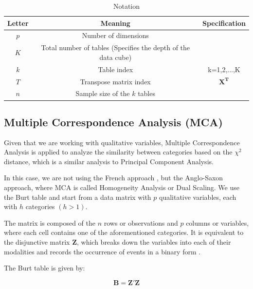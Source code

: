\documentclass[mathematics,article,submit,moreauthors,pdftex]{mdpi}
\begin{document}
\begin{table}[!ht]
\begin{center}
 \begin{tabular}{||c ||c | c ||} 
 \hline
 Letter & Meaning & Specification\\
 \hline\hline
 $p$ & Number of dimensions &\\
\hline
 $K$ &  Total number of tables (Specifies the depth of the data cube) & \\
 \hline
 $k$ & Table index &  k=1,2,...,K\\
  \hline
 $T$ & Transpose matrix index &  $\mathbf{X^{T}}$\\
\hline
 $n$ & Sample size of the $k$ tables &\\
\hline
\end{tabular}\caption{Notation}
\label{tab:notacion2}
\end{center}
\end{table}

\hypertarget{multiple-correspondence-analysis-mca}{%
\subsection{Multiple Correspondence Analysis
(MCA)}\label{multiple-correspondence-analysis-mca}}

Given that we are working with qualitative variables, Multiple
Correspondence Analysis \citep{Benzecri} is applied to analyze the
similarity between categories \citep{perez2004} based on the \(\chi^2\)
distance, which is a similar analysis to Principal Component Analysis.

In this case, we are not using the French approach
\citep{michailidis1998}, but the Anglo-Saxon approach, where MCA is
called Homogeneity Analysis or Dual Scaling. We use the Burt table
\citep{Benzecri} and start from a data matrix with \(p\) qualitative
variables, each with \(h\) categories \((h>1)\).

The matrix is composed of the \(n\) rows or observations and \(p\)
columns or variables, where each cell contains one of the aforementioned
categories. It is equivalent to the disjunctive matrix \textbf{Z}, which
breaks down the variables into each of their modalities and records the
occurrence of events in a binary form \citep{Benzecri}.

The Burt table is given by:

\begin{equation}
\mathbf{B}=\mathbf{Z'}\mathbf{Z}
\label{eq:Burt}
\end{equation}
\end{document}
